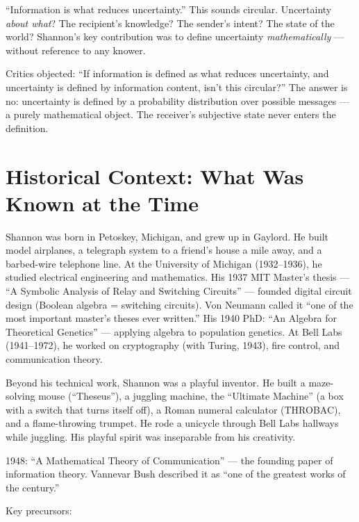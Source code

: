 ``Information is what reduces uncertainty.'' This sounds circular. Uncertainty \emph{about what}? The recipient's knowledge? The sender's intent? The state of the world? Shannon's key contribution was to define uncertainty \emph{mathematically} — without reference to any knower.

Critics objected: ``If information is defined as what reduces uncertainty, and uncertainty is defined by information content, isn't this circular?'' The answer is no: uncertainty is defined by a probability distribution over possible messages — a purely mathematical object. The receiver's subjective state never enters the definition.

\section{Historical Context: What Was Known at the Time}
\label{sec:information:context}

Shannon was born in Petoskey, Michigan, and grew up in Gaylord. He built model airplanes, a telegraph system to a friend's house a mile away, and a barbed-wire telephone line. At the University of Michigan (1932--1936), he studied electrical engineering and mathematics. His 1937 MIT Master's thesis — ``A Symbolic Analysis of Relay and Switching Circuits'' — founded digital circuit design (Boolean algebra = switching circuits). Von Neumann called it ``one of the most important master's theses ever written.'' His 1940 PhD: ``An Algebra for Theoretical Genetics'' — applying algebra to population genetics. At Bell Labs (1941--1972), he worked on cryptography (with Turing, 1943), fire control, and communication theory.

Beyond his technical work, Shannon was a playful inventor. He built a maze-solving mouse (``Theseus''), a juggling machine, the ``Ultimate Machine'' (a box with a switch that turns itself off), a Roman numeral calculator (THROBAC), and a flame-throwing trumpet. He rode a unicycle through Bell Labs hallways while juggling. His playful spirit was inseparable from his creativity.

1948: ``A Mathematical Theory of Communication'' — the founding paper of information theory. Vannevar Bush described it as ``one of the greatest works of the century.''

Key precursors:

